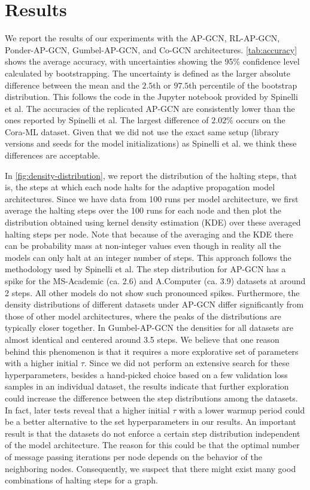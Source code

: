 \documentclass{gdl}
\begin{document}
\section{Results}
We report the results of our experiments with the AP-GCN, RL-AP-GCN, Ponder-AP-GCN, Gumbel-AP-GCN, and Co-GCN architectures. \autoref{tab:accuracy} shows the average accuracy, with uncertainties showing the 95\% confidence level calculated by bootstrapping. The uncertainty is defined as the larger absolute difference between the mean and the $2.5$th or $97.5$th percentile of the bootstrap distribution. This follows the code in the Jupyter notebook provided by Spinelli et al. The accuracies of the replicated AP-GCN are consistently lower than the ones reported by Spinelli et al. The largest difference of $2.02\%$ occurs on the Cora-ML dataset. Given that we did not use the exact same setup (library versions and seeds for the model initializations) as Spinelli et al. we think these differences are acceptable. 

In \autoref{fig:density-distribution}, we report the distribution of the halting steps, that is, the steps at which each node halts for the adaptive propagation model architectures. Since we have data from 100 runs per model architecture, we first average the halting steps over the 100 runs for each node and then plot the distribution obtained using kernel density estimation (KDE) over these averaged halting steps per node. Note that because of the averaging and the KDE there can be probability mass at non-integer values even though in reality all the models can only halt at an integer number of steps. This approach follows the methodology used by Spinelli et al. The step distribution for AP-GCN has a spike for the MS-Academic (ca. 2.6) and A.Computer (ca. 3.9) datasets at around 2 steps. All other models do not show such pronounced spikes. Furthermore,  the density distributions of different datasets under AP-GCN differ significantly from those of other model architectures, where the peaks of the distributions are typically closer together. In Gumbel-AP-GCN the densities for all datasets are almost identical and centered around 3.5 steps. We believe that one reason behind this phenomenon is that it requires a more explorative set of parameters with a higher initial $\tau$. Since we did not perform an extensive search for these hyperparameters, besides a hand-picked choice based on a few validation loss samples in an individual dataset, the results indicate that further exploration could increase the difference between the step distributions among the datasets. In fact, later tests reveal that a higher initial $\tau$ with a lower warmup period could be a better alternative to the set hyperparameters in our results.  
An important result is that the datasets do not enforce a certain step distribution independent of the model architecture. The reason for this could be that the optimal number of message passing iterations per node depends on the behavior of the neighboring nodes. Consequently, we suspect that there might exist many good combinations of halting steps for a graph.
\end{document}
